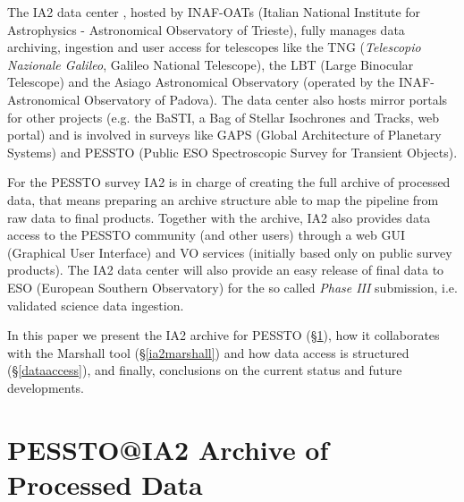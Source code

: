 The IA2 data center \citep{molinaro_spie12}, hosted by INAF-OATs (Italian National Institute for Astrophysics - Astronomical Observatory of Trieste), fully manages data archiving, ingestion and user access for telescopes like the TNG (\textit{Telescopio Nazionale Galileo}, Galileo National Telescope), the LBT (Large Binocular Telescope) and the Asiago Astronomical Observatory (operated by the INAF-Astronomical Observatory of Padova). The data center also hosts mirror portals for other projects (e.g. the BaSTI, a Bag of Stellar Isochrones and Tracks, web portal) and is involved in surveys like GAPS (Global Architecture of Planetary Systems) and PESSTO (Public ESO Spectroscopic Survey for Transient Objects).

For the PESSTO survey IA2 is in charge of creating the full archive of processed data, that means preparing an archive structure able to map the pipeline from raw data to final products. Together with the archive, IA2 also provides data access to the PESSTO community (and other users) through a web GUI (Graphical User Interface) and VO services (initially based only on public survey products). The IA2 data center will also provide an easy release of final data to ESO (European Southern Observatory) for the so called \textit{Phase III} submission, i.e. validated science data ingestion.

In this paper we present the IA2 archive for PESSTO (\S \ref{ia2archive}), how it collaborates with the Marshall tool (\S \ref{ia2marshall}) and how data access is structured (\S \ref{dataaccess}), and finally, conclusions on the current status and future developments.

\section{PESSTO@IA2 Archive of Processed Data}\label{ia2archive}

